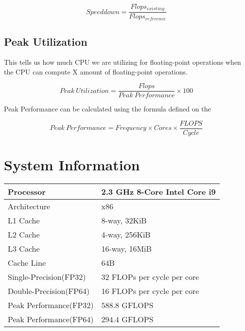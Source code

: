 \begin{equation}
    Speeddown = \frac{Flops_{existing}}{Flops_{reference}}
    \label{eq:speeddown}
\end{equation}

\subsection{Peak Utilization}

This tells us how much CPU we are utilizing for floating-point operations when 
the CPU can compute X amount of floating-point operations.

\begin{equation}
    Peak\ Utilization = \frac{Flops}{Peak\ Performance} \times 100
    \label{eq:peak_util}
\end{equation}

Peak Performance can be calculated using the formula defined on the \citep{wiki:FLOPS}

\begin{equation}
    Peak\ Performance = Frequency \times Cores \times \frac{FLOPS}{Cycle}
\end{equation}

\clearpage
\section{System Information}
\begin{table}[htb]
    \centering
    \begin{tabular}{|l | l|}
        \hline
        Processor & 2.3 GHz 8-Core Intel Core i9 \\
        \hline
        Architecture & x86 \\
        \hline
        L1 Cache & 8-way, 32KiB \\
        \hline
        L2 Cache & 4-way, 256KiB \\
        \hline
        L3 Cache & 16-way, 16MiB \\
        \hline
        Cache Line & 64B \\
        \hline
        Single-Precision(FP32) & 32 FLOPs per cycle per core \\
        \hline
        Double-Precision(FP64) & 16 FLOPs per cycle per core\\
        \hline
        Peak Performance(FP32) & $588.8$ GFLOPS\\
        \hline
        Peak Performance(FP64) & $294.4$ GFLOPS\\
        \hline
    \end{tabular}
\end{table}

